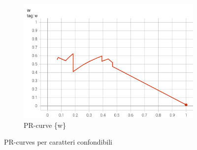 \begin{figure}[htbp]
\begin{subfigure}[t]{0.32\textwidth}
        \includegraphics[width=\textwidth]{images/pr_curve_conf3.png}
        \caption{PR-curve \{w\}}
    \end{subfigure}
    \caption{PR-curves per caratteri confondibili}
    \label{fig:pr-confondibili}
\end{figure}

